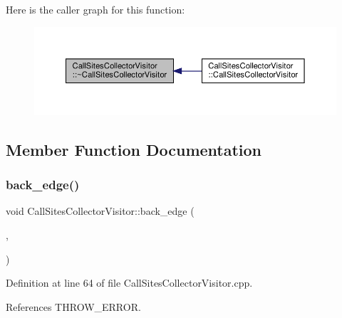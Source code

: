 Here is the caller graph for this function\+:
\nopagebreak
\begin{figure}[H]
\begin{center}
\leavevmode
\includegraphics[width=350pt]{d2/da7/classCallSitesCollectorVisitor_a93aae645aa234551c112786f96bcabfb_icgraph}
\end{center}
\end{figure}


\subsection{Member Function Documentation}
\mbox{\label{classCallSitesCollectorVisitor_a9a9f3e4c7614f9dee1db7f949cc2dbb9}} 
\subsubsection{\texorpdfstring{back\+\_\+edge()}{back\_edge()}}
{\footnotesize\ttfamily void Call\+Sites\+Collector\+Visitor\+::back\+\_\+edge (\begin{DoxyParamCaption}\item[{const \hyperlink{graph_8hpp_a9eb9afea34e09f484b21f2efd263dd48}{Edge\+Descriptor} \&}]{,  }\item[{const \hyperlink{classCallGraph}{Call\+Graph} \&}]{ }\end{DoxyParamCaption})}



Definition at line 64 of file Call\+Sites\+Collector\+Visitor.\+cpp.



References T\+H\+R\+O\+W\+\_\+\+E\+R\+R\+OR.

\mbox{\label{classCallSitesCollectorVisitor_a0385b9d39f5930eaf55ce2e137ad1864}} 
